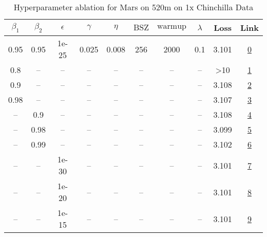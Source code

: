 \begin{table}[H]
\centering
\caption{Hyperparameter ablation for Mars on 520m on 1x Chinchilla Data}
\label{tab:ablation_mars_520m_1}
\begin{tabular}{cccccccccc}
\toprule
$\beta_1$ & $\beta_2$ & $\epsilon$ & $\gamma$ & $\eta$ & $\mathrm{BSZ}$ & $\mathrm{warmup}$ & $\lambda$ & Loss & Link \\
\midrule
0.95 & 0.95 & 1e-25 & 0.025 & 0.008 & 256 & 2000 & 0.1 & 3.101 & \href{https://wandb.ai/stanford-mercury/optimizer-scaling/runs/sweep-520m-10B-mars5423a5lr0.008-wd0.1-minlr0-warmup2000-b10.95--3bb28e}{0} \\
\midrule
0.8 & -- & -- & -- & -- & -- & -- & -- & >10 & \href{https://wandb.ai/stanford-mercury/optimizer-scaling/runs/sweep-520m-10B-marsa9730clr0.008-wd0.1-minlr0-warmup2000-b10.8-b-076bee}{1} \\
0.9 & -- & -- & -- & -- & -- & -- & -- & 3.108 & \href{https://wandb.ai/stanford-mercury/optimizer-scaling/runs/sweep-520m-10B-mars789cdclr0.008-wd0.1-minlr0-warmup2000-b10.9-b-e6ccdf}{2} \\
0.98 & -- & -- & -- & -- & -- & -- & -- & 3.107 & \href{https://wandb.ai/stanford-mercury/optimizer-scaling/runs/sweep-520m-10B-mars0de768lr0.008-wd0.1-minlr0-warmup2000-b10.98--080115}{3} \\
-- & 0.9 & -- & -- & -- & -- & -- & -- & 3.108 & \href{https://wandb.ai/stanford-mercury/optimizer-scaling/runs/sweep-520m-10B-mars58007elr0.008-wd0.1-minlr0-warmup2000-b10.95--235a3d}{4} \\
-- & 0.98 & -- & -- & -- & -- & -- & -- & 3.099 & \href{https://wandb.ai/stanford-mercury/optimizer-scaling/runs/sweep-520m-10B-marsc95aa3lr0.008-wd0.1-minlr0-warmup2000-b10.95--142484}{5} \\
-- & 0.99 & -- & -- & -- & -- & -- & -- & 3.102 & \href{https://wandb.ai/stanford-mercury/optimizer-scaling/runs/sweep-520m-10B-mars104ea4lr0.008-wd0.1-minlr0-warmup2000-b10.95--2f3096}{6} \\
-- & -- & 1e-30 & -- & -- & -- & -- & -- & 3.101 & \href{https://wandb.ai/stanford-mercury/optimizer-scaling/runs/sweep-520m-10B-mars5423a5lr0.008-wd0.1-minlr0-warmup2000-b10.95--3bb28e}{7} \\
-- & -- & 1e-20 & -- & -- & -- & -- & -- & 3.101 & \href{https://wandb.ai/stanford-mercury/optimizer-scaling/runs/sweep-520m-10B-mars657b86lr0.008-wd0.1-minlr0-warmup2000-b10.95--f3ff84}{8} \\
-- & -- & 1e-15 & -- & -- & -- & -- & -- & 3.101 & \href{https://wandb.ai/stanford-mercury/optimizer-scaling/runs/sweep-520m-10B-mars77342alr0.008-wd0.1-minlr0-warmup2000-b10.95--6c9adf}{9} \\

\end{tabular}
\end{table}
